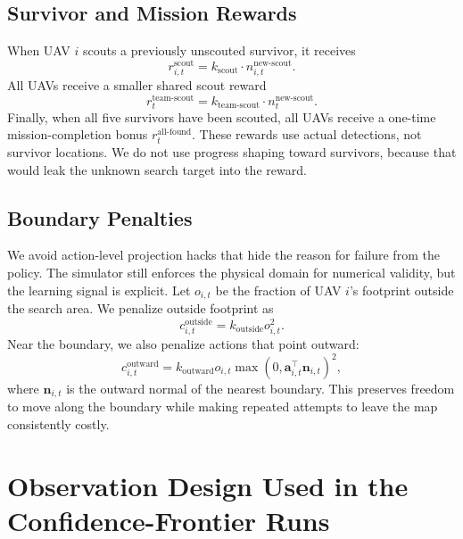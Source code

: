 \documentclass{article}
\newcommand{\act}{\mathbf{a}}
\begin{document}
\subsection{Survivor and Mission Rewards}

When UAV \(i\) scouts a previously unscouted survivor, it receives
\begin{equation}
    r^{\mathrm{scout}}_{i,t}
    =
    k_{\mathrm{scout}}
    \cdot n^{\mathrm{new\text{-}scout}}_{i,t}.
\end{equation}
All UAVs receive a smaller shared scout reward
\begin{equation}
    r^{\mathrm{team\text{-}scout}}_t
    =
    k_{\mathrm{team\text{-}scout}}
    \cdot n^{\mathrm{new\text{-}scout}}_{t}.
\end{equation}
Finally, when all five survivors have been scouted, all UAVs receive a one-time
mission-completion bonus \(r^{\mathrm{all\text{-}found}}_t\). These rewards use
actual detections, not survivor locations. We do not use progress shaping toward
survivors, because that would leak the unknown search target into the reward.

\subsection{Boundary Penalties}

We avoid action-level projection hacks that hide the reason for failure from the
policy. The simulator still enforces the physical domain for numerical validity,
but the learning signal is explicit. Let \(o_{i,t}\) be the fraction of UAV
\(i\)'s footprint outside the search area. We penalize outside footprint as
\begin{equation}
    c^{\mathrm{outside}}_{i,t}
    =
    k_{\mathrm{outside}} o_{i,t}^{2}.
    \label{eq:outside_penalty}
\end{equation}
Near the boundary, we also penalize actions that point outward:
\begin{equation}
    c^{\mathrm{outward}}_{i,t}
    =
    k_{\mathrm{outward}}
    o_{i,t}
    \max(0, \act_{i,t}^{\top}\mathbf{n}_{i,t})^2,
    \label{eq:outward_penalty}
\end{equation}
where \(\mathbf{n}_{i,t}\) is the outward normal of the nearest boundary. This
preserves freedom to move along the boundary while making repeated attempts to
leave the map consistently costly.

\section{Observation Design Used in the Confidence-Frontier Runs}
\end{document}
